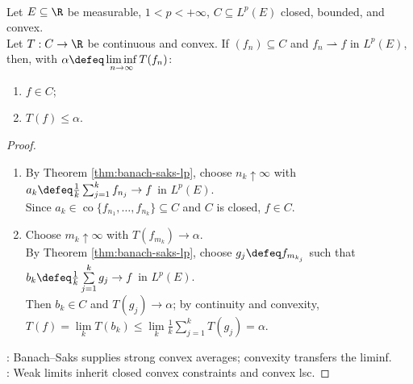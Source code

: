 \begin{lemma} \label{lem:banach-saks-weak-limit-closed-convex-lsc} \\
Let $E\subseteq\R$ be measurable, $1<p<+\infty$, $C\subseteq L^p(E)$ closed, bounded, and convex.\\
Let $T:C\to\R$ be continuous and convex. If $(f_n)\subseteq C$ and $f_n\rightharpoonup f$ in $L^p(E)$, then, with $\alpha\defeq\liminf\limits_{n\to\infty}T(f_n)$:
\begin{enumerate}[label=(\roman*)]
\setlength{\itemsep}{0pt}
\item $f\in C$;
\item $T(f)\leq\alpha$.
\end{enumerate}
\begin{proof}
\begin{enumerate}[label=(\roman*)]
\setlength{\itemsep}{0pt}
\item By Theorem \ref{thm:banach-saks-lp}, choose $n_k\uparrow\infty$ with $a_k\defeq\frac{1}{k}\sum_{j=1}^kf_{n_j}\to f$ in $L^p(E)$.\\
Since $a_k\in\operatorname{co}\{f_{n_1},\ldots,f_{n_k}\}\subseteq C$ and $C$ is closed, $f\in C$.
\item Choose $m_k\uparrow\infty$ with $T(f_{m_k})\to\alpha$.\\
By Theorem \ref{thm:banach-saks-lp}, choose $g_j\defeq f_{m_{k_j}}$ such that $b_k\defeq\frac{1}{k}\sum\limits_{j=1}^kg_j\to f$ in $L^p(E)$.\\
Then $b_k\in C$ and $T(g_j)\to\alpha$; by continuity and convexity, $T(f)=\lim\limits_kT(b_k)\leq\lim\limits_k\frac{1}{k}\sum\limits_{j=1}^kT(g_j)=\alpha$.
\end{enumerate}
: Banach--Saks supplies strong convex averages; convexity transfers the liminf.\\
: Weak limits inherit closed convex constraints and convex lsc.
\end{proof}
\end{lemma}

